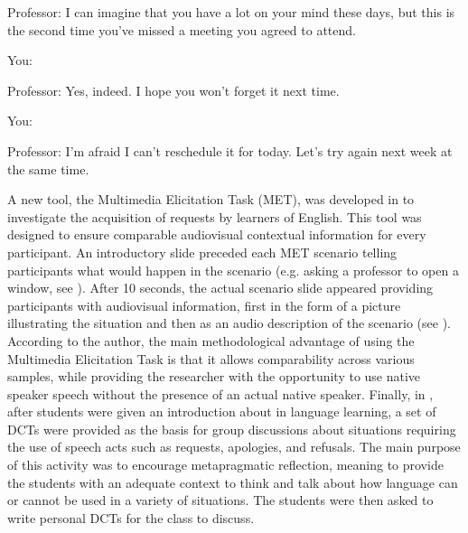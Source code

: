 \documentclass[output=paper]{LSP/langsci}
\begin{document}
Professor: I can imagine that you have a lot on your mind these days, but this is the second time you’ve missed a meeting you agreed to attend.


You: {\longrule}{\longrule}{\longrule}{\longrule}{\longrule}{\longrule}{\longrule}{\longrule}{\longrule}{\longrule}{\longrule}{\longrule}{\longrule}{\longrule}{\longrule}{\longrule}


Professor: Yes, indeed. I hope you won’t forget it next time.  


You: {\longrule}{\longrule}{\longrule}{\longrule}{\longrule}{\longrule}{\longrule}{\longrule}{\longrule}{\longrule}{\longrule}{\longrule}{\longrule}{\longrule}{\longrule}{\longrule}

Professor: I’m afraid I can’t reschedule it for today. Let’s try again next week at the same time.
    \z


A new tool, the Multimedia Elicitation Task (MET), was developed in \citet{Schauer2004} to investigate the acquisition of requests by  learners of English. This tool was designed to ensure comparable audiovisual contextual information for every participant. An introductory slide preceded each MET scenario telling par\-ti\-ci\-pants what would happen in the scenario (e.g. asking a professor to open a window, see ). After 10 seconds, the actual scenario slide appeared providing par\-ti\-ci\-pants with audiovisual information, first in the form of a picture illustrating the situation and then as an audio description of the scenario (see ). According to the author, the main methodological advantage of using the Multimedia Elicitation Task is that it allows comparability across various samples, while providing the researcher with the opportunity to use native speaker speech without the presence of an actual native speaker. Finally, in \citet{McLean2005}, after students were given an introduction about  in language learning, a set of DCTs were provided as the basis for group discussions about situations requiring the use of speech acts such as requests, apologies, and refusals. The main purpose of this activity was to encourage metapragmatic reflection, meaning to provide the students with an adequate context to think and talk about how language can or cannot be used in a variety of situations. The students were then asked to write personal DCTs for the class to discuss. 
\end{document}
